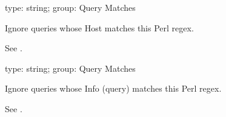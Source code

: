 \documentclass[letterpaper,10pt,english]{sphinxmanual}
\begin{document}
\begin{fulllineitems}
\label{\detokenize{mariadb-kill:cmdoption-mariadb-kill-ignore-host}}
\sphinxAtStartPar
type: string; group: Query Matches

\sphinxAtStartPar
Ignore queries whose Host matches this Perl regex.

\sphinxAtStartPar
See {\hyperref[\detokenize{mariadb-kill:cmdoption-mariadb-kill-match-host}]{}}.

\end{fulllineitems}


\begin{fulllineitems}
\label{\detokenize{mariadb-kill:cmdoption-mariadb-kill-ignore-info}}
\sphinxAtStartPar
type: string; group: Query Matches

\sphinxAtStartPar
Ignore queries whose Info (query) matches this Perl regex.

\sphinxAtStartPar
See {\hyperref[\detokenize{mariadb-kill:cmdoption-mariadb-kill-match-info}]{}}.

\end{fulllineitems}

\end{document}
